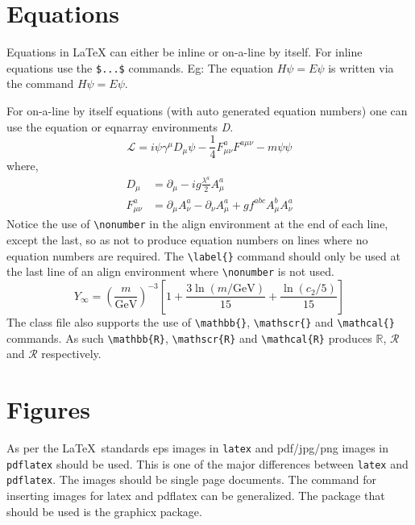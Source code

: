 \documentclass[journal=eds]{CAM-MODERN}%
\theoremstyle{definition}
\numberwithin{equation}{section}
\begin{document}
\section{Equations}

Equations in \LaTeX{} can either be inline or on-a-line by itself. For
inline equations use the \verb+$...$+ commands. Eg: The equation
$H\psi = E \psi$ is written via the command $H \psi = E \psi$.

For on-a-line by itself equations (with auto generated equation numbers)
one can use the equation or eqnarray environments \textit{D}.
\begin{equation}
\mathcal{L} = i {\psi} \gamma^\mu D_\mu \psi
    - \frac{1}{4} F_{\mu\nu}^a F^{a\mu\nu} - m {\psi} \psi
\label{eq1}
\end{equation}
where,
\begin{align}
D_\mu &=  \partial_\mu - ig \frac{\lambda^a}{2} A^a_\mu
\nonumber \\
F^a_{\mu\nu} &= \partial_\mu A^a_\nu - \partial_\nu A^a_\mu
    + g f^{abc} A^b_\mu A^a_\nu
\label{eq2}
\end{align}
Notice the use of \verb+\nonumber+ in the align environment at the end
of each line, except the last, so as not to produce equation numbers on
lines where no equation numbers are required. The \verb+\label{}+ command
should only be used at the last line of an align environment where
\verb+\nonumber+ is not used.
\begin{equation}
Y_\infty = \left( \frac{m}{\textrm{GeV}} \right)^{-3}
    \left[ 1 + \frac{3 \ln(m/\textrm{GeV})}{15}
    + \frac{\ln(c_2/5)}{15} \right]
\end{equation}
The class file also supports the use of \verb+\mathbb{}+, \verb+\mathscr{}+ and
\verb+\mathcal{}+ commands. As such \verb+\mathbb{R}+, \verb+\mathscr{R}+
and \verb+\mathcal{R}+ produces $\mathbb{R}$, $\mathscr{R}$ and $\mathcal{R}$
respectively.

\section{Figures}

As per the \LaTeX\ standards eps images in \verb!latex! and pdf/jpg/png images in
\verb!pdflatex! should be used. This is one of the major differences between \verb!latex!
and \verb!pdflatex!. The images should be single page documents. The command for inserting images
for latex and pdflatex can be generalized. The package that should be used
is the graphicx package.
\end{document}
